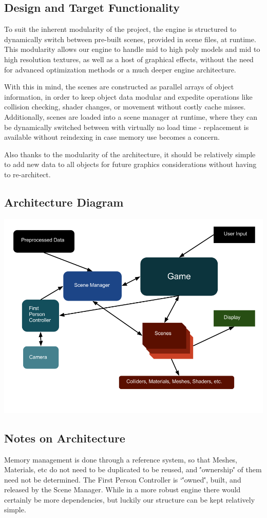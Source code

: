 \documentclass[11pt]{article} %
\begin{document}
\subsection{Design and Target Functionality}
To suit the inherent modularity of the project, the engine is structured to dynamically
switch between pre-built scenes, provided in scene files, at runtime. This modularity allows
our engine to handle mid to high poly models and mid to high resolution textures, as well as a host of graphical effects, without the need for advanced optimization methods or a much deeper engine architecture. 
\par With this in mind, the scenes are constructed as parallel arrays of object information, in order to keep object data modular and expedite operations like collision checking, shader changes, or movement without costly cache misses. Additionally, scenes are loaded into a scene manager at runtime, where they can be dynamically switched between with virtually no load time - replacement is available without reindexing in case memory use becomes a concern.
\par Also thanks to the modularity of the architecture, it should be relatively simple to add new data to all objects for future graphics considerations without having to re-architect.
\subsection{Architecture Diagram}
\includegraphics[scale=.4]{architecturediagram.png}
\subsection{Notes on Architecture}
Memory management is done through a reference system, so that Meshes, Materials, etc do not need to be duplicated to be reused, and \''ownership\'' of them need not be determined. The First Person Controller is `\''owned\'', built, and released by the Scene Manager. While in a more robust engine there would certainly be more dependencies, but luckily our structure can be kept relatively simple. 
\end{document}
